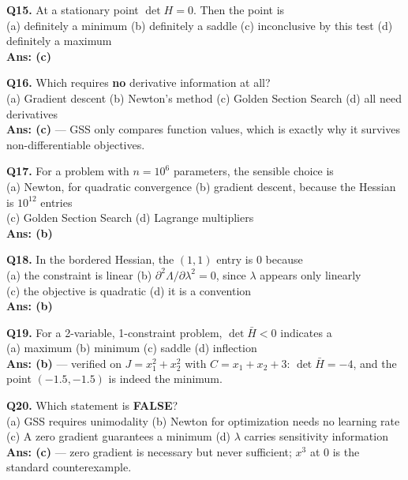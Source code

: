 \begin{mcqbox}
\textbf{Q15.} At a stationary point $\det H = 0$. Then the point is\\
(a) definitely a minimum \quad (b) definitely a saddle \quad (c) inconclusive by this test \quad (d) definitely a maximum\\
\textbf{Ans: (c)}

\textbf{Q16.} Which requires \textbf{no} derivative information at all?\\
(a) Gradient descent \quad (b) Newton's method \quad (c) Golden Section Search \quad (d) all need derivatives\\
\textbf{Ans: (c)} --- GSS only compares function values, which is exactly why it survives non-differentiable objectives.

\textbf{Q17.} For a problem with $n = 10^6$ parameters, the sensible choice is\\
(a) Newton, for quadratic convergence \quad (b) gradient descent, because the Hessian is $10^{12}$ entries\\
(c) Golden Section Search \quad (d) Lagrange multipliers\\
\textbf{Ans: (b)}

\textbf{Q18.} In the bordered Hessian, the $(1,1)$ entry is $0$ because\\
(a) the constraint is linear \quad (b) $\partial^2\Lambda/\partial\lambda^2 = 0$, since $\lambda$ appears only linearly\\
(c) the objective is quadratic \quad (d) it is a convention\\
\textbf{Ans: (b)}

\textbf{Q19.} For a 2-variable, 1-constraint problem, $\det\bar H < 0$ indicates a\\
(a) maximum \quad (b) minimum \quad (c) saddle \quad (d) inflection\\
\textbf{Ans: (b)} --- verified on $J = x_1^2+x_2^2$ with $C = x_1+x_2+3$: $\det\bar H = -4$, and the point $(-1.5,-1.5)$ is indeed the minimum.

\textbf{Q20.} Which statement is \textbf{FALSE}?\\
(a) GSS requires unimodality \quad (b) Newton for optimization needs no learning rate\\
(c) A zero gradient guarantees a minimum \quad (d) $\lambda$ carries sensitivity information\\
\textbf{Ans: (c)} --- zero gradient is necessary but never sufficient; $x^3$ at $0$ is the standard counterexample.
\end{mcqbox}

